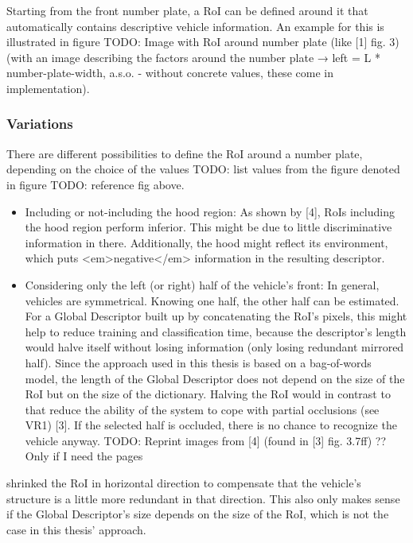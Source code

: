 Starting from the front number plate, a RoI can be defined around it that automatically contains descriptive vehicle information. An example for this is illustrated in figure TODO: Image with RoI around number plate (like [1] fig. 3) (with an image describing the factors around the number plate → left = L * number-plate-width, a.s.o. - without concrete values, these come in implementation).

\subsubsection{Variations}
There are different possibilities to define the RoI around a number plate, depending on the choice of the values TODO: list values from the figure denoted in figure TODO: reference fig above.

\begin{itemize}
  \item Including or not-including the hood region: As shown by [4], RoIs including the hood region perform inferior. This might be due to little discriminative information in there. Additionally, the hood might reflect its environment, which puts <em>negative</em> information in the resulting descriptor.
  \item Considering only the left (or right) half of the vehicle’s front: In general, vehicles are symmetrical. Knowing one half, the other half can be estimated. For a Global Descriptor built up by concatenating the RoI’s pixels, this might help to reduce training and classification time, because the descriptor’s length would halve itself without losing information (only losing redundant mirrored half). Since the approach used in this thesis is based on a bag-of-words model, the length of the Global Descriptor does not depend on the size of the RoI but on the size of the dictionary. Halving the RoI would in contrast to that reduce the ability of the system to cope with partial occlusions (see VR1) [3]. If the selected half is occluded, there is no chance to recognize the vehicle anyway. TODO: Reprint images from [4] (found in [3] fig. 3.7ff) ?? Only if I need the pages
\end{itemize}

\citeauthor{petrovic2004analysis} \citep{petrovic2004analysis} shrinked the RoI in horizontal direction to compensate that the vehicle's structure is a little more redundant in that direction. This also only makes sense if the Global Descriptor's size depends on the size of the RoI, which is not the case in this thesis' approach.

